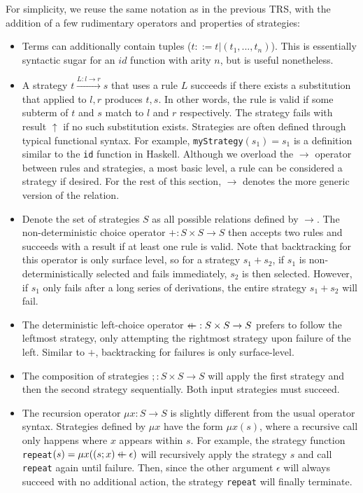 \documentclass{article}
\makeatletter
\newcommand{\superimpose}[2]{{%
  \ooalign{%
    \hfil$\m@th#1\@firstoftwo#2$\hfil\cr
    \hfil$\m@th#1\@secondoftwo#2$\hfil\cr
  }%
}}
\newcommand{\leftplus}{\mathbin{\mathpalette\superimpose{{\leftarrow}{+}}}}
\makeatother
\begin{document}
For simplicity, we reuse the same notation as in the previous TRS, with the addition of a few rudimentary operators and properties of strategies:
\begin{itemize}
    \item Terms can additionally contain tuples ($t ::= t | (t_1, ..., t_n)$). This is essentially syntactic sugar for an $id$ function with arity $n$,
    but is useful nonetheless.
    \item A strategy $t \xrightarrow{L: l\rightarrow r} s$ that uses a rule $L$ succeeds if there exists a substitution that applied to $l, r$ produces $t, s$.
    In other words, the rule is valid if some subterm of $t$ and $s$ match to $l$ and $r$ respectively.
    The strategy fails with result $\uparrow$ if no such substitution exists.
    Strategies are often defined through typical functional syntax. For example, \texttt{myStrategy}$(s_1) = s_1$ is a definition similar to the \texttt{id}
    function in Haskell.
    Although we overload the $\rightarrow$ operator between rules and strategies, a most basic level, a rule can be considered a strategy if desired.
    For the rest of this section, $\rightarrow$ denotes the more generic version of the relation.
    \item Denote the set of strategies $S$ as all possible relations defined by $\rightarrow$. The non-deterministic choice operator $+: S \times S\rightarrow S$
    then accepts two rules and succeeds with a result if at least one rule is valid. Note that backtracking for this operator is only surface level,
    so for a strategy $s_1 + s_2$, if $s_1$ is non-deterministically selected and fails immediately, $s_2$ is then selected. However,
    if $s_1$ only fails after a long series of derivations, the entire strategy $s_1 + s_2$ will fail.
    \item The deterministic left-choice operator $\leftplus: S \times S \rightarrow S$ prefers to follow the leftmost strategy, only attempting the rightmost strategy
    upon failure of the left. Similar to $+$, backtracking for failures is only surface-level.
    \item The composition of strategies $;: S \times S \rightarrow S$ will apply the first strategy and then the second strategy sequentially. Both
    input strategies must succeed.
    \item The recursion operator $\mu x: S \rightarrow S$ is slightly different from the usual operator syntax. Strategies defined by $\mu x$ have the form
    $\mu x (s)$, where a recursive call only happens where $x$ appears within $s$. For example, the strategy function \texttt{repeat}$(s) = \mu x ((s;x)\leftplus \epsilon)$
    will recursively apply the strategy $s$ and call \texttt{repeat} again until failure. Then, since the other argument $\epsilon$ will always succeed with
    no additional action, the strategy \texttt{repeat} will finally terminate.
\end{itemize}
\end{document}
